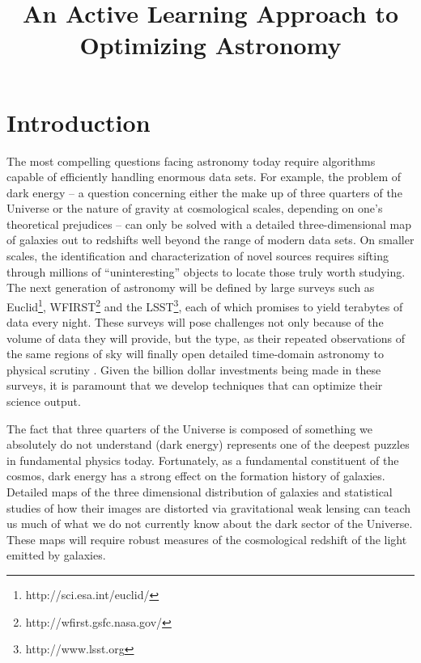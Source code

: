 \documentclass[prd, nofootinbib, floatfix, 12pt,tightenlines]{revtex4}
\begin{document}
 
\sloppy
\title
{An Active Learning Approach to Optimizing Astronomy
}


\label{firstpage}


\maketitle 



\section{Introduction}

The most compelling questions facing astronomy today require algorithms capable
of efficiently handling enormous data sets.  
For example, the problem of dark energy --
a question concerning either the make up of three quarters of the Universe or
the nature of gravity at cosmological scales, depending on one's theoretical
prejudices -- can only be solved with a detailed three-dimensional map of
galaxies out to redshifts well beyond the range of modern data sets.  On smaller
scales, the identification and characterization of novel sources requires
sifting through millions of ``uninteresting'' 
objects to locate those truly
worth studying.  The next generation of astronomy will be defined by
large surveys such as Euclid\footnote{http://sci.esa.int/euclid/},
WFIRST\footnote{http://wfirst.gsfc.nasa.gov/} and the
LSST\footnote{http://www.lsst.org}, each of which promises to yield terabytes of
data every night.  
These surveys will pose challenges not only because of the volume of data they
will provide, but the type, as their repeated observations of the same regions
of sky will finally open detailed time-domain astronomy to physical scrutiny
\cite{sciencebook}.
Given the billion dollar investments being made in these surveys,
it is paramount that we develop techniques that
can optimize their science output.

The fact that three quarters of the Universe is composed of something we absolutely
do not understand (dark energy) represents one of the deepest puzzles in fundamental
physics today.  Fortunately, as a fundamental constituent of the cosmos, dark energy
has a strong effect on the formation history of galaxies.
Detailed maps of the three dimensional distribution of galaxies 
\cite{muvarpi2,roland} and statistical studies of how their images are distorted via
gravitational weak lensing \cite{sudeep} can teach us much of what we do not
currently know about the dark sector of the Universe.  These maps will require
robust measures of the cosmological redshift of the light emitted by galaxies.
\end{document}
